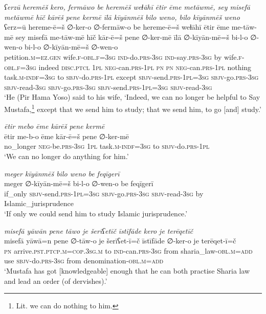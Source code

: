 \ea \label{ŽP.72}
\textit{ʕerzū heremēš kero, fermāwo be heremēš weɫāhī ētir ēme metāwmē, sey misefā metāwmē hīč kārēš pene kermē īlā kīyānmēš bilo weno, bilo kīyānmēš weno} \\ 
\gll ʕerz=ū hereme-ē=š ∅-ker-o ∅-fermāw-o be hereme-ē=š weɫāhī ētir ēme me-tāw-mē sey misefā me-tāw-mē hīč kār-ē=š pene ∅-ker-mē īlā ∅-kīyān-mē=š bi-l-o ∅-wen-o bi-l-o ∅-kīyān-mē=š ∅-wen-o \\ 
 petition\textsc{.m}\textsc{\textsc{=ez.gen}} wife\textsc{.f}\textsc{-obl}\textsc{.f}\textsc{=3sg} \textsc{ind-}do\textsc{.prs}\textsc{-3sg} \textsc{ind-}say\textsc{.prs}\textsc{-3sg} by wife\textsc{.f}\textsc{-obl}\textsc{.f}\textsc{=3sg} indeed \textsc{disc.ptcl} \textsc{1pl} \textsc{neg-}can\textsc{.prs}\textsc{-1pl} \textsc{pn} \textsc{pn} \textsc{neg-}can\textsc{.prs}\textsc{-1pl} nothing task\textsc{.m}\textsc{-indf}\textsc{=3sg} to \textsc{sbjv-}do\textsc{.prs}\textsc{-1pl} except \textsc{sbjv-}send\textsc{.prs}\textsc{-1pl}\textsc{=3sg} \textsc{sbjv-}go\textsc{.prs}\textsc{-3sg} \textsc{sbjv-}read\textsc{-3sg} \textsc{sbjv-}go\textsc{.prs}\textsc{-3sg} \textsc{sbjv-}send\textsc{.prs}\textsc{-1pl}\textsc{=3sg} \textsc{sbjv-}read\textsc{-3sg} \\ 
\glt `He (Pir Hama Yoso) said to his wife, ‘Indeed, we can no longer be helpful to Say Mustafa,\footnote{Lit. we can do nothing to him.} except that we send him to study; that we send him, to go [and] study.'
\z 
 
\ea \label{ŽP.75}
\textit{ētir mebo ēme kārēš pene kermē} \\ 
\gll ētir me-b-o ēme kār-ē=š pene ∅-ker-mē \\ 
 no\_longer \textsc{neg-}be\textsc{.prs}\textsc{-3sg} \textsc{1pl} task\textsc{.m}\textsc{-indf}\textsc{=3sg} to \textsc{sbjv-}do\textsc{.prs}\textsc{-1pl} \\ 
\glt `We can no longer do anything for him.'
\z 
 
\ea \label{ŽP.78}
\textit{meger kīyānmēš bilo weno be feqīgerī} \\ 
\gll meger ∅-kīyān-mē=š bi-l-o ∅-wen-o be feqīgerī \\ 
 if\_only \textsc{sbjv-}send\textsc{.prs}\textsc{-1pl}\textsc{=3sg} \textsc{sbjv-}go\textsc{.prs}\textsc{-3sg} \textsc{sbjv-}read\textsc{-3sg} by Islamic\_jurisprudence \\ 
\glt `If only we could send him to study Islamic jurisprudence.'
\z 
 
\ea \label{ŽP.84}
\textit{misefā yāwān pene tāwo je šerīʕetīč īstīfāde kero je terēqetīč} \\ 
\gll misefā yāwā=n pene ∅-tāw-o je šerīʕet-ī=č īstīfāde ∅-ker-o je terēqet-ī=č \\ 
 \textsc{pn} arrive\textsc{.pst}\textsc{.ptcp}\textsc{.m}\textsc{=cop}\textsc{.3sg}\textsc{.m} to \textsc{ind-}can\textsc{.prs}\textsc{-3sg} from sharia\_law\textsc{-obl}\textsc{.m}\textsc{=add} use \textsc{sbjv-}do\textsc{.prs}\textsc{-3sg} from denomination\textsc{-obl}\textsc{.m}\textsc{=add} \\ 
\glt `Mustafa has got [knowledgeable] enough that he can both practise Sharia law and lead an order (of dervishes).'
\z 
 
